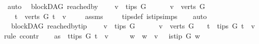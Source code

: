 \begin{isabellebody}
\ auto\isanewline
{}\isamarkupfalse%
%
\endisatagproof
{\isafoldproof}%
%
\isadelimproof
\isanewline
%
\endisadelimproof
\isanewline
\isanewline
{}\isamarkupfalse%
\ {\isacharparenleft}{\kern0pt}\ blockDAG{\isacharparenright}{\kern0pt}\ reached{\isacharunderscore}{\kern0pt}by{\isacharcolon}{\kern0pt}\ \isanewline
\ \ \ {\isachardoublequoteopen}v\ {\isasymnotin}\ tips\ G{\isachardoublequoteclose}\isanewline
\ \ \ \ \ \ {\isachardoublequoteopen}v\ {\isasymin}\ verts\ G{\isachardoublequoteclose}\isanewline
\ \ \ {\isachardoublequoteopen}{\isasymexists}t\ {\isasymin}\ verts\ G{\isachardot}{\kern0pt}\ t\ {\isasymrightarrow}\isactrlsup {\isacharplus}{\kern0pt}\ v{\isachardoublequoteclose}\ \isanewline
%
\isadelimproof
\ \ %
\endisadelimproof
%
\isatagproof
{}\isamarkupfalse%
\ assms\ \isanewline
\ \ \isamarkupfalse%
\ tips{\isacharunderscore}{\kern0pt}def\ is{\isacharunderscore}{\kern0pt}tip{\isachardot}{\kern0pt}simps\isanewline
\ \ \isamarkupfalse%
\ auto%
\endisatagproof
{\isafoldproof}%
%
\isadelimproof
\ \isanewline
%
\endisadelimproof
\isanewline
{}\isamarkupfalse%
\ {\isacharparenleft}{\kern0pt}\ blockDAG{\isacharparenright}{\kern0pt}\ reached{\isacharunderscore}{\kern0pt}by{\isacharunderscore}{\kern0pt}tip{\isacharcolon}{\kern0pt}\ \isanewline
\ \ \ {\isachardoublequoteopen}v\ {\isasymnotin}\ tips\ G{\isachardoublequoteclose}\isanewline
\ \ \ \ \ \ {\isachardoublequoteopen}v\ {\isasymin}\ verts\ G{\isachardoublequoteclose}\isanewline
\ \ \ {\isachardoublequoteopen}{\isasymexists}t\ {\isasymin}\ tips\ G{\isachardot}{\kern0pt}\ t\ {\isasymrightarrow}\isactrlsup {\isacharplus}{\kern0pt}\ v{\isachardoublequoteclose}\ \isanewline
%
\isadelimproof
%
\endisadelimproof
%
\isatagproof
{}\isamarkupfalse%
{\isacharparenleft}{\kern0pt}rule\ ccontr{\isacharparenright}{\kern0pt}\isanewline
\ \ \isamarkupfalse%
\ as{}{\isacharcolon}{\kern0pt}\ {\isachardoublequoteopen}{\isasymnot}\ {\isacharparenleft}{\kern0pt}{\isasymexists}t{\isasymin}tips\ G{\isachardot}{\kern0pt}\ t\ {\isasymrightarrow}\isactrlsup {\isacharplus}{\kern0pt}\ v{\isacharparenright}{\kern0pt}{\isachardoublequoteclose}\isanewline
\ \ \isamarkupfalse%
\ \isamarkupfalse%
\ {\isachardoublequoteopen}{\isasymforall}w{\isachardot}{\kern0pt}\ \ w\ {\isasymrightarrow}\isactrlsup {\isacharplus}{\kern0pt}\ v\ {\isasymlongrightarrow}\ {\isasymnot}\ is{\isacharunderscore}{\kern0pt}tip\ G\ w{\isachardoublequoteclose}\ \isanewline

\end{isabellebody}
